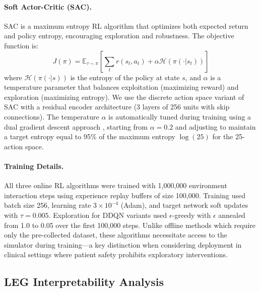 \paragraph{Soft Actor-Critic (SAC).}
SAC \citep{haarnoja2018soft} is a maximum entropy RL algorithm that optimizes both expected return and policy entropy, encouraging exploration and robustness. The objective function is:
\begin{equation}
J(\pi) = \mathbb{E}_{\tau \sim \pi}\left[\sum_t r(s_t, a_t) + \alpha \mathcal{H}(\pi(\cdot|s_t))\right]
\end{equation}
where $\mathcal{H}(\pi(\cdot|s))$ is the entropy of the policy at state $s$, and $\alpha$ is a temperature parameter that balances exploitation (maximizing reward) and exploration (maximizing entropy). We use the discrete action space variant of SAC with a residual encoder architecture (3 layers of 256 units with skip connections). The temperature $\alpha$ is automatically tuned during training using a dual gradient descent approach \citep{haarnoja2018soft_applications}, starting from $\alpha = 0.2$ and adjusting to maintain a target entropy equal to 95\% of the maximum entropy $\log(25)$ for the 25-action space.

\paragraph{Training Details.}
All three online RL algorithms were trained with 1,000,000 environment interaction steps using experience replay buffers of size 100,000. Training used batch size 256, learning rate $3 \times 10^{-4}$ (Adam), and target network soft updates with $\tau = 0.005$. Exploration for DDQN variants used $\epsilon$-greedy with $\epsilon$ annealed from 1.0 to 0.05 over the first 100,000 steps. Unlike offline methods which require only the pre-collected dataset, these algorithms necessitate access to the simulator during training—a key distinction when considering deployment in clinical settings where patient safety prohibits exploratory interventions.

\subsection{LEG Interpretability Analysis}\label{sec:methods:leg}

